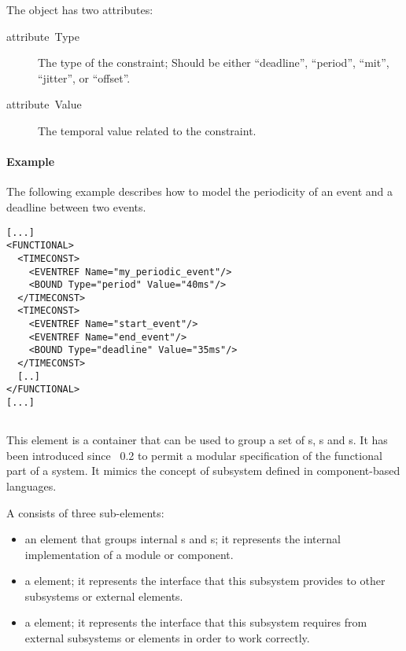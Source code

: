 The  object has two attributes:

\begin{description}
\item [{attribute~Type}] The type of the constraint; Should be either
  ``deadline'', ``period'', ``mit'', ``jitter'', or ``offset''.
\item [{attribute~Value}] The temporal value related to the
  constraint.
\end{description}


\paragraph{Example}

The following example describes how to model the periodicity of an
event and a deadline between two events.

\begin{lstlisting}
[...]
<FUNCTIONAL>
  <TIMECONST>
    <EVENTREF Name="my_periodic_event"/>
    <BOUND Type="period" Value="40ms"/>
  </TIMECONST>
  <TIMECONST> 
    <EVENTREF Name="start_event"/>
    <EVENTREF Name="end_event"/>
    <BOUND Type="deadline" Value="35ms"/>
  </TIMECONST> 
  [..]
</FUNCTIONAL>
[...]
\end{lstlisting}

\subsection{}
\label{sub:SUBSYSTEM}

This element is a container that can be used to group a set of
s, s and s. It has been
introduced since \rtd\ 0.2 to permit a modular specification of the
functional part of a system. It mimics the concept of subsystem
defined in component-based languages.

A  consists of three sub-elements:

\begin{itemize}
\item an  element that groups internal
  s and s; it represents the
  internal implementation of a module or component.
\item a  element; it represents the
  interface that this subsystem provides to other subsystems or
  external elements.
\item a  element; it represents the
  interface that this subsystem requires from external subsystems or
  elements in order to work correctly.
\end{itemize}

